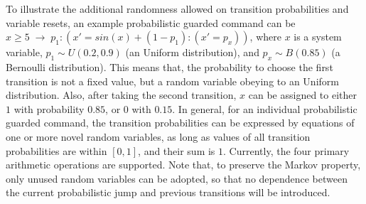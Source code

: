 To illustrate the additional randomness allowed on transition probabilities and variable resets, an example probabilistic guarded command can be $x \geq 5 \; \rightarrow \; p_1:(x' = sin(x) + (1-p_1):(x' = p_x))$, where $x$ is a system variable, $p_1 \sim  U(0.2, 0.9)$ (an Uniform distribution), and $p_x  \sim  B(0.85)$ (a Bernoulli distribution). This means that, the probability to choose the first transition is not a fixed value, but a random variable obeying to an Uniform distribution. Also, after taking the second transition, $x$ can be assigned to either $1$ with probability $0.85$, or $0$ with $0.15$. In general, for an individual probabilistic guarded command, the transition probabilities can be expressed by equations of one or more novel random variables, as long as values of all transition probabilities are within $[0, 1]$, and their sum is $1$. Currently, the four primary arithmetic operations are supported. Note that, to preserve the Markov property, only unused random variables can be adopted, so that no dependence between the current probabilistic jump and previous transitions will be introduced. 





